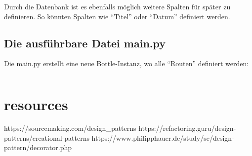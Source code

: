 Durch die Datenbank ist es ebenfalls möglich weitere Spalten für später zu definieren. So könnten Spalten wie ``Titel'' oder ``Datum'' definiert werden. 

\subsection{Die ausführbare Datei main.py}
Die main.py erstellt eine neue Bottle-Instanz, wo alle ``Routen'' definiert werden:
\begin{lstlisting}[caption=Routen]

\end{lstlisting}






\clearpage
\section{resources}
https://sourcemaking.com/design\_patterns
https://refactoring.guru/design-patterns/creational-patterns
https://www.philipphauer.de/study/se/design-pattern/decorator.php
